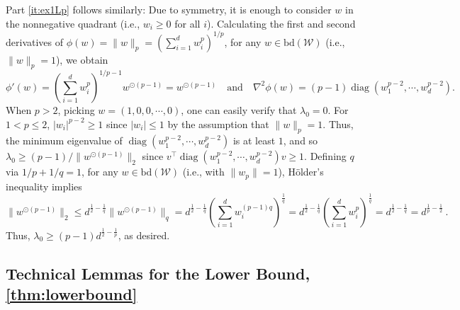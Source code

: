 \documentclass[english]{article}
\newcommand{\cW}{\mathcal{W}}
\newcommand{\bd}{\mathrm{bd}}
\DeclareMathOperator{\diag}{diag}
\newenvironment{proofof}[1]{\par\noindent{\bf Proof of #1\ }}{\hfill\BlackBox\\[2mm]}
\begin{document}
\begin{proofof}{\cref{ex:curvature}}
Part \eqref{it:ex1Lp} follows similarly: Due to symmetry, it is enough to consider $w$ in the nonnegative quadrant (i.e., $w_i \ge 0$ for all $i$). Calculating the first and second derivatives of $\phi(w)=\|w\|_p = \left(\sum_{i=1}^{d}w_i^p\right)^{1/p}$, for any $w \in \bd(\cW)$ (i.e., $\|w\|_p=1$), we obtain
\[
\phi'(w) = \left(\sum_{i=1}^{d} w_i^p\right)^{1/p-1}w^{\odot (p-1)} = w^{\odot(p-1)}
\quad \text{and} \quad
\nabla^2\phi(w) =  (p-1) \diag\left(w_1^{p-2},\cdots,w_d^{p-2}\right).
\]
When $p>2$, picking $w = (1,0,0,\cdots, 0)$, one can easily verify that $\lambda_0 = 0$. For $1<p\le 2$, $|w_i|^{p-2} \ge 1$ since $|w_i| \le 1$ by the assumption that $\|w\|_p = 1$. Thus, the minimum eigenvalue of $\diag\left(w_1^{p-2},\cdots,w_d^{p-2}\right)$ is at least $1$, and so $\lambda_0 \ge (p-1)/\|w^{\odot(p-1)}\|_2$ since $ v^\top \diag\left(w_1^{p-2},\cdots,w_d^{p-2}\right) v \ge 1$.
Defining $q$ via $1/p+1/q=1$, for any $w \in \bd(\cW)$ (i.e., with $\|w_p\|=1$), H\"older's inequality implies
\[
\|w^{\odot(p-1)}\|_2 \le d^{\frac{1}{2}-\frac{1}{q}} \|w^{\odot(p-1)}\|_q = d^{\frac{1}{2}-\frac{1}{q}}  \left(\sum_{i=1}^d w_i^{(p-1)q}\right)^\frac{1}{q}
= d^{\frac{1}{2}-\frac{1}{q}}  \left(\sum_{i=1}^d w_i^{p}\right)^\frac{1}{q} = d^{\frac{1}{2}-\frac{1}{q}}  = d^{\frac{1}{p}-\frac{1}{2}}~.
\]
Thus, $\lambda_0 \ge (p-1)d^{\frac{1}{2}-\frac{1}{p}}$, as desired.
\end{proofof}



\subsection{Technical Lemmas for the Lower Bound, \cref{thm:lowerbound}}
\label{sec:pr-lowerbound}
\end{document}
